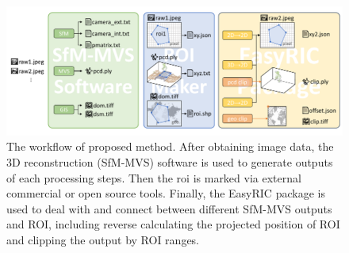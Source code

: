 \documentclass{configs/bmcart}
\begin{document}
\begin{backmatter}




\begin{figure}[!htb]
  \includegraphics[width=0.95\linewidth]{figures/workflow.pdf}
  \caption{The workflow of proposed method. After obtaining image data, the 3D reconstruction (SfM-MVS) software is used to generate outputs of each processing steps. Then the \acrfull*{roi} is marked via external commercial or open source tools. Finally, the EasyRIC package is used to deal with and connect between different SfM-MVS outputs and ROI, including reverse calculating the projected position of ROI and clipping the output by ROI ranges.}
  \label{fig:workflow}
\end{figure}


\end{backmatter}
\end{document}
